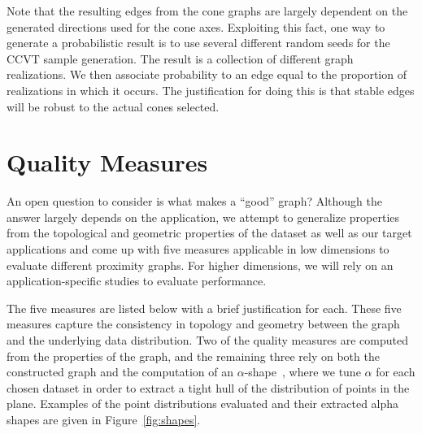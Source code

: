Note that the resulting edges from the cone graphs are largely dependent on the generated directions used for the cone axes.
%
Exploiting this fact, one way to generate a probabilistic result is to use several different random seeds for the CCVT sample generation.
%
The result is a collection of different graph realizations.
%
We then associate probability to an edge equal to the proportion of realizations in which it occurs.
%
The justification for doing this is that stable edges will be robust to the actual cones selected.


\section{Quality Measures}
\label{sec:graph_quality_measures}
An open question to consider is what makes a ``good'' graph?
%
Although the answer largely depends on the application, we attempt to generalize properties from the topological and geometric properties of the dataset as well as our target applications and come up with five measures applicable in low dimensions to evaluate different proximity graphs.
%
For higher dimensions, we will rely on an application-specific studies to evaluate performance.

The five measures are listed below with a brief justification for each.
%
These five measures capture the consistency in topology and geometry between the graph and the underlying data distribution.
%
Two of the quality measures are computed from the properties of the graph, and the remaining three rely on both the constructed graph and the computation of an $\alpha$-shape~\cite{EdelsbrunnerKirkpatrickSeidel1983}, where we tune $\alpha$ for each chosen dataset in order to extract a tight hull of the distribution of points in the plane.
%
Examples of the point distributions evaluated and their extracted alpha shapes are given in Figure~\ref{fig:shapes}.

